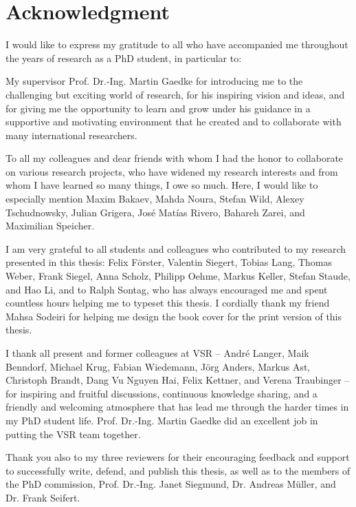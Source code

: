 \chapter*{Acknowledgment}
\label{chp:acknowledgment}
\vspace*{-10mm}

I would like to express my gratitude to all who have accompanied me throughout the years of research as a PhD student, in particular to:

My supervisor Prof. Dr.-Ing. Martin Gaedke for introducing me to the challenging but exciting world of research, for his inspiring vision and ideas, and for giving me the opportunity to learn and grow under his guidance in a supportive and motivating environment that he created and to collaborate with many international researchers. 

To all my colleagues and dear friends with whom I had the honor to collaborate on various research projects, who have widened my research interests and from whom I have learned so many things, I owe so much. 
Here, I would like to especially mention Maxim Bakaev, Mahda Noura, Stefan Wild, Alexey Tschudnowsky, Julian Grigera, José Matías Rivero, Bahareh Zarei, and Maximilian Speicher.

I am very grateful to all students and colleagues who contributed to my research presented in this thesis: Felix Förster, Valentin Siegert, Tobias Lang, Thomas Weber, Frank Siegel, Anna Scholz, Philipp Oehme, Markus Keller, Stefan Staude, and Hao Li, and to Ralph Sontag, who has always encouraged me and spent countless hours helping me to typeset this thesis. I cordially thank my friend Mahsa Sodeiri for helping me design the book cover for the print version of this thesis.

I thank all present and former colleagues at VSR -- André Langer, Maik Benndorf, Michael Krug, Fabian Wiedemann, Jörg Anders, Markus Ast, Christoph Brandt, Dang Vu Nguyen Hai, Felix Kettner, and Verena Traubinger -- for inspiring and fruitful discussions, continuous knowledge sharing, and a friendly and welcoming atmosphere that has lead me through the harder times in my PhD student life. Prof. Dr.-Ing. Martin Gaedke did an excellent job in putting the VSR team together.

Thank you also to my three reviewers for their encouraging feedback and support to successfully write, defend, and publish this thesis, as well as to the members of the PhD  commission, Prof. Dr.-Ing. Janet Siegmund, Dr. Andreas Müller, and Dr. Frank Seifert.

